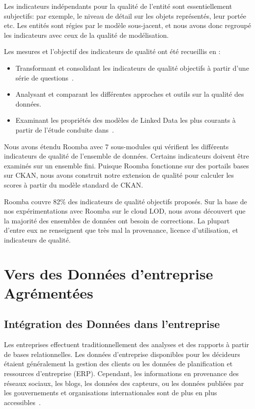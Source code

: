 Les indicateurs ind\'{e}pendants pour la qualit\'{e} de l'entit\'{e} sont essentiellement subjectifs: par exemple, le niveau de d\'{e}tail sur les objets repr\'{e}sent\'{e}s, leur port\'{e}e etc. Les entit\'{e}s sont r\'{e}gies par le mod\`{e}le sous-jacent, et nous avons donc regroup\'{e} les indicateurs avec ceux de la qualit\'{e} de mod\'{e}lisation.

Les mesures et l'objectif des indicateurs de qualit\'{e} ont \'{e}t\'{e} recueillis en :

\begin{itemize}
	\item Transformant et consolidant les indicateurs de qualit\'{e} objectifs à partir d'une s\'{e}rie de questions~\cite{Assaf:DQMST:12}.
	\item Analysant et comparant les diff\'{e}rentes approches et outils sur la qualit\'{e} des donn\'{e}es.
	\item Examinant les propri\'{e}t\'{e}s des mod\`{e}les de Linked Data les plus courants à partir de l'\'{e}tude conduite dans~\cite{Assaf:PROFILES:15}.
\end{itemize}

Nous avons \'{e}tendu Roomba avec 7 sous-modules qui v\'{e}rifient les diff\'{e}rents indicateurs de qualit\'{e} de l'ensemble de donn\'{e}es. Certains indicateurs doivent être examin\'{e}s sur un ensemble fini. Puisque Roomba fonctionne sur des portails bases sur CKAN, nous avons construit notre extension de qualit\'{e} pour calculer les scores à partir du mod\`{e}le standard de CKAN.

Roomba couvre 82\% des indicateurs de qualit\'{e} objectifs propos\'{e}s. Sur la base de nos exp\'{e}rimentations avec Roomba sur le cloud LOD, nous avons d\'{e}couvert que la majorit\'{e} des ensembles de donn\'{e}es ont besoin de corrections. La plupart d'entre eux ne renseignent que tr\`{e}s mal la provenance, licence d'utilisation, et indicateurs de qualit\'{e}.

\let\cleardoublepage\clearpage
\section{Vers des Donn\'{e}es d'entreprise Agr\'{e}ment\'{e}es}

\subsection{Int\'{e}gration des Donn\'{e}es dans l'entreprise}
Les entreprises effectuent traditionnellement des analyses et des rapports à partir de bases relationnelles. Les donn\'{e}es d'entreprise disponibles pour les d\'{e}cideurs \'{e}taient g\'{e}n\'{e}ralement la gestion des clients ou les donn\'{e}es de planification et ressources d'entreprise (ERP). Cependant, les informations en provenance des r\'{e}seaux sociaux, les blogs, les donn\'{e}es des capteurs, ou les donn\'{e}es publi\'{e}es par les gouvernements et organisations internationales sont de plus en plus accessibles~\cite{Boyd:Article:11}.


